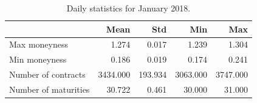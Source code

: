 \begin{table}
\caption{\label{tab:appli_stats}Daily statistics for January 2018.}
\centering
\begin{tabular}{lrrrr}
\toprule
 & Mean & Std & Min & Max\\
\midrule
Max moneyness & 1.274 & 0.017 & 1.239 & 1.304\\
Min moneyness & 0.186 & 0.019 & 0.174 & 0.241\\
Number of contracts & 3434.000 & 193.934 & 3063.000 & 3747.000\\
Number of maturities & 30.722 & 0.461 & 30.000 & 31.000\\
\bottomrule
\end{tabular}
\end{table}